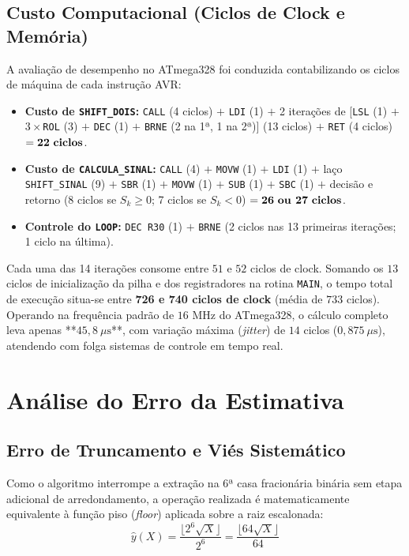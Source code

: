 \documentclass[conference]{IEEEtran}
\begin{document}
\subsection{Custo Computacional (Ciclos de Clock e Memória)}
A avaliação de desempenho no ATmega328 foi conduzida contabilizando os ciclos de máquina de cada instrução AVR:
\begin{itemize}
	\item \textbf{Custo de \texttt{SHIFT\_DOIS}:} \texttt{CALL} (4 ciclos) $+$ \texttt{LDI} (1) $+$ 2 iterações de [\texttt{LSL} (1) $+$ $3\times$\texttt{ROL} (3) $+$ \texttt{DEC} (1) $+$ \texttt{BRNE} (2 na 1ª, 1 na 2ª)] (13 ciclos) $+$ \texttt{RET} (4 ciclos) $= \mathbf{22\text{ \textbf{ciclos}}}$.
	\item \textbf{Custo de \texttt{CALCULA\_SINAL}:} \texttt{CALL} (4) $+$ \texttt{MOVW} (1) $+$ \texttt{LDI} (1) $+$ laço \texttt{SHIFT\_SINAL} (9) $+$ \texttt{SBR} (1) $+$ \texttt{MOVW} (1) $+$ \texttt{SUB} (1) $+$ \texttt{SBC} (1) $+$ decisão e retorno (8 ciclos se $S_k \ge 0$; 7 ciclos se $S_k < 0$) $= \mathbf{26\text{ \textbf{ou }}27\text{ \textbf{ciclos}}}$.
	\item \textbf{Controle do \texttt{LOOP}:} \texttt{DEC R30} (1) $+$ \texttt{BRNE} (2 ciclos nas 13 primeiras iterações; 1 ciclo na última).
\end{itemize}

Cada uma das 14 iterações consome entre $51$ e $52$ ciclos de clock. Somando os $13$ ciclos de inicialização da pilha e dos registradores na rotina \texttt{MAIN}, o tempo total de execução situa-se entre \textbf{726 e 740 ciclos de clock} (média de $733$ ciclos). Operando na frequência padrão de $16\text{ MHz}$ do ATmega328, o cálculo completo leva apenas **$45{,}8\ \mu\text{s}$**, com variação máxima (\textit{jitter}) de $14$ ciclos ($0{,}875\ \mu\text{s}$), atendendo com folga sistemas de controle em tempo real.

\section{Análise do Erro da Estimativa}

\subsection{Erro de Truncamento e Viés Sistemático}
Como o algoritmo interrompe a extração na 6ª casa fracionária binária sem etapa adicional de arredondamento, a operação realizada é matematicamente equivalente à função piso (\textit{floor}) aplicada sobre a raiz escalonada:
\begin{equation}
	\hat{y}(X) = \frac{\lfloor 2^6 \sqrt{X} \rfloor}{2^6} = \frac{\lfloor 64\sqrt{X} \rfloor}{64}
	\label{eq:floor}
\end{equation}
\end{document}
